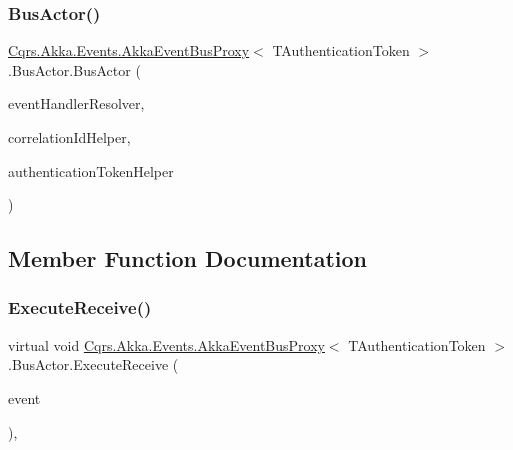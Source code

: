 \subsubsection{\texorpdfstring{Bus\+Actor()}{BusActor()}}
{\footnotesize\ttfamily \hyperlink{classCqrs_1_1Akka_1_1Events_1_1AkkaEventBusProxy}{Cqrs.\+Akka.\+Events.\+Akka\+Event\+Bus\+Proxy}$<$ T\+Authentication\+Token $>$.Bus\+Actor.\+Bus\+Actor (\begin{DoxyParamCaption}\item[{\hyperlink{interfaceCqrs_1_1Akka_1_1Events_1_1IAkkaEventPublisher}{I\+Akka\+Event\+Publisher}$<$ T\+Authentication\+Token $>$}]{event\+Handler\+Resolver,  }\item[{I\+Correlation\+Id\+Helper}]{correlation\+Id\+Helper,  }\item[{\hyperlink{interfaceCqrs_1_1Authentication_1_1IAuthenticationTokenHelper}{I\+Authentication\+Token\+Helper}$<$ T\+Authentication\+Token $>$}]{authentication\+Token\+Helper }\end{DoxyParamCaption})}



\subsection{Member Function Documentation}
\mbox{\label{classCqrs_1_1Akka_1_1Events_1_1AkkaEventBusProxy_1_1BusActor_a90a6f4b440d2e2d9b997f6280ce67921_a90a6f4b440d2e2d9b997f6280ce67921}} 
\subsubsection{\texorpdfstring{Execute\+Receive()}{ExecuteReceive()}}
{\footnotesize\ttfamily virtual void \hyperlink{classCqrs_1_1Akka_1_1Events_1_1AkkaEventBusProxy}{Cqrs.\+Akka.\+Events.\+Akka\+Event\+Bus\+Proxy}$<$ T\+Authentication\+Token $>$.Bus\+Actor.\+Execute\+Receive (\begin{DoxyParamCaption}\item[{\hyperlink{interfaceCqrs_1_1Events_1_1IEvent}{I\+Event}$<$ T\+Authentication\+Token $>$ @}]{event }\end{DoxyParamCaption})\hspace{0.3cm}{\ttfamily [protected]}, {\ttfamily [virtual]}}



